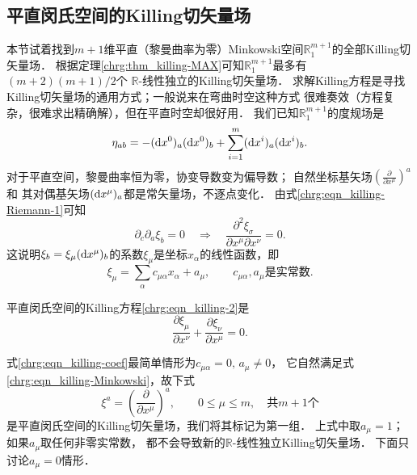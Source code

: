 
\subsection{平直闵氏空间的Killing切矢量场}\label{chrg:sec_killing-Minkowski}
本节试着找到$m+1$维平直（黎曼曲率为零）Minkowski空间$\mathbb{R}^{m+1}_1$的全部Killing切矢量场．
根据定理\ref{chrg:thm_killing-MAX}可知$\mathbb{R}^{m+1}_1$最多有$(m+2)(m+1)/2$个
$\mathbb{R}$-线性独立的Killing切矢量场．
求解Killing方程是寻找Killing切矢量场的通用方式；一般说来在弯曲时空这种方式
很难奏效（方程复杂，很难求出精确解），但在平直时空却很好用．
我们已知$\mathbb{R}^{m+1}_1$的度规场是
\begin{equation}
    \eta_{ab} = -({\rm d}x^0)_a ({\rm d}x^0)_b+
    \sum_{i=1}^{m} ({\rm d}x^i)_a({\rm d}x^i)_b .
\end{equation}
对于平直空间，黎曼曲率恒为零，协变导数变为偏导数；
自然坐标基矢场$(\frac{\partial}{\partial x^\mu})^a$和
其对偶基矢场$({\rm d}x^\mu)_a$都是常矢量场，不逐点变化．
由式\eqref{chrg:eqn_killing-Riemann-1}可知
\begin{equation}
    {\partial_c}{\partial_a}{\xi_b} = 0 \quad \Rightarrow \quad
    \frac{\partial^2 \xi_\sigma}{\partial x^\mu \partial x^\nu} = 0.
\end{equation}
这说明$\xi_b = \xi_\mu ({\rm d}x^\mu)_b$的系数$\xi_\mu$是坐标$x_\alpha$的线性函数，即
\begin{equation}\label{chrg:eqn_killing-coef}
    \xi_\mu = \sum_{\alpha}c_{\mu \alpha}x_\alpha + a_\mu,\qquad
    c_{\mu \alpha}, a_\mu \text{是实常数}.
\end{equation}


平直闵氏空间的Killing方程\eqref{chrg:eqn_killing-2}是
\begin{equation}\label{chrg:eqn_killing-Minkowski}
    \frac{\partial \xi_\mu}{\partial x^\nu}+\frac{\partial \xi_\nu}{\partial x^\mu} =0 .
\end{equation}

式\eqref{chrg:eqn_killing-coef}最简单情形为$c_{\mu \alpha}=0,\, a_\mu \neq 0$，
它自然满足式\eqref{chrg:eqn_killing-Minkowski}，故下式
\begin{equation}\label{chrg:eqn_Killing-Minkowski-1}
    \xi^a= \left(\frac{\partial}{\partial x^\mu }\right)^a ,
    \qquad    0\leqslant \mu \leqslant m,\quad \text{共$m+1$个}
\end{equation}
是平直闵氏空间的Killing切矢量场，我们将其标记为第一组．
上式中取$a_\mu=1$；如果$a_\mu$取任何非零实常数，
都不会导致新的$\mathbb{R}$-线性独立Killing切矢量场．
下面只讨论$a_\mu=0$情形．


